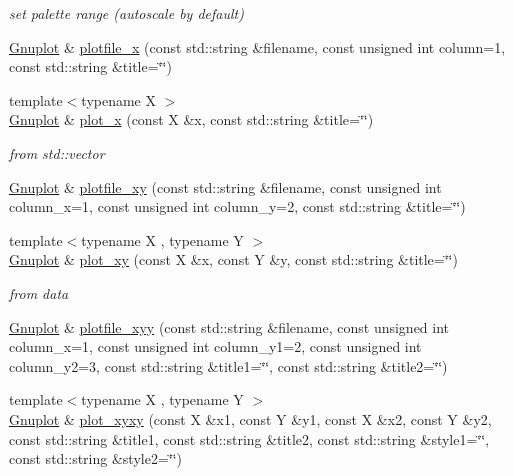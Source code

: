 \begin{DoxyCompactItemize}
\begin{DoxyCompactList}\small\item\em set palette range (autoscale by default) \end{DoxyCompactList}\item 
\hyperlink{class_gnuplot}{Gnuplot} \& \hyperlink{class_gnuplot_a4fc34218cdfdd27a65b92eea1f1f9e84}{plotfile\-\_\-x} (const std\-::string \&filename, const unsigned int column=1, const std\-::string \&title=\char`\"{}\char`\"{})
\item 
{\footnotesize template$<$typename X $>$ }\\\hyperlink{class_gnuplot}{Gnuplot} \& \hyperlink{class_gnuplot_a80f3b2baae2bceff78ad005d9c3ec3fb}{plot\-\_\-x} (const X \&x, const std\-::string \&title=\char`\"{}\char`\"{})
\begin{DoxyCompactList}\small\item\em from std\-::vector \end{DoxyCompactList}\item 
\hyperlink{class_gnuplot}{Gnuplot} \& \hyperlink{class_gnuplot_a10e1fc7344bd726faa2d70cd5ced5e5e}{plotfile\-\_\-xy} (const std\-::string \&filename, const unsigned int column\-\_\-x=1, const unsigned int column\-\_\-y=2, const std\-::string \&title=\char`\"{}\char`\"{})
\item 
{\footnotesize template$<$typename X , typename Y $>$ }\\\hyperlink{class_gnuplot}{Gnuplot} \& \hyperlink{class_gnuplot_a0514a7391de6b42e79732ce746c310f7}{plot\-\_\-xy} (const X \&x, const Y \&y, const std\-::string \&title=\char`\"{}\char`\"{})
\begin{DoxyCompactList}\small\item\em from data \end{DoxyCompactList}\item 
\hyperlink{class_gnuplot}{Gnuplot} \& \hyperlink{class_gnuplot_a26cbba36864ad7f1f6683b11558e3b49}{plotfile\-\_\-xyy} (const std\-::string \&filename, const unsigned int column\-\_\-x=1, const unsigned int column\-\_\-y1=2, const unsigned int column\-\_\-y2=3, const std\-::string \&title1=\char`\"{}\char`\"{}, const std\-::string \&title2=\char`\"{}\char`\"{})
\item 
\hypertarget{class_gnuplot_ac0c275ff75d700fc8e9f55d15dea1ea3}{{\footnotesize template$<$typename X , typename Y $>$ }\\\hyperlink{class_gnuplot}{Gnuplot} \& \hyperlink{class_gnuplot_ac0c275ff75d700fc8e9f55d15dea1ea3}{plot\-\_\-xyxy} (const X \&x1, const Y \&y1, const X \&x2, const Y \&y2, const std\-::string \&title1, const std\-::string \&title2, const std\-::string \&style1=\char`\"{}\char`\"{}, const std\-::string \&style2=\char`\"{}\char`\"{})}\label{class_gnuplot_ac0c275ff75d700fc8e9f55d15dea1ea3}


\end{DoxyCompactItemize}
